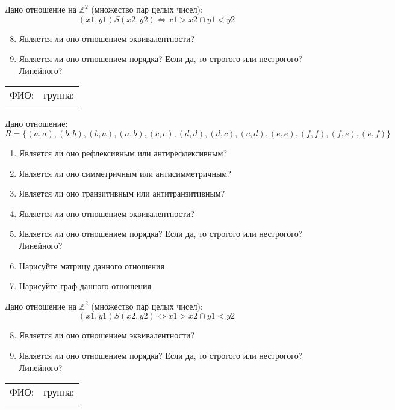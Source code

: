 \documentclass[russian,12pt]{article}
\begin{document}
Дано отношение на $\mathbb{Z}^2$ (множество пар целых чисел):
$$(x1, y1)S(x2, y2) \iff x1 > x2 \cap y1 < y2$$
\begin{enumerate}
\setcounter{enumi}{7}
\item Является ли оно отношением эквивалентности?
\item Является ли оно отношением порядка? Если да, то строгого или нестрогого? Линейного?
\end{enumerate}
\newpage
\thispagestyle{empty}
\begin{tabular}{|p{}|p{}|}
\hline
ФИО: & группа: \\
 & \\ \hline
\end{tabular}

\vspace{12pt}

Дано отношение:
$$R = \{(a, a), (b, b), (b, a), (a, b), (c, c), (d, d), (d, c), (c, d), (e, e), (f, f), (f, e), (e, f)\}$$
\begin{enumerate}
\item Является ли оно рефлексивным или антирефлексивным?
\item Является ли оно симметричным или антисимметричным?
\item Является ли оно транзитивным или антитранзитивным?
\item Является ли оно отношением эквивалентности?
\item Является ли оно отношением порядка? Если да, то строгого или нестрогого? Линейного?
\item Нарисуйте матрицу данного отношения
\item Нарисуйте граф данного отношения
\end{enumerate}

Дано отношение на $\mathbb{Z}^2$ (множество пар целых чисел):
$$(x1, y1)S(x2, y2) \iff x1 > x2 \cap y1 < y2$$
\begin{enumerate}
\setcounter{enumi}{7}
\item Является ли оно отношением эквивалентности?
\item Является ли оно отношением порядка? Если да, то строгого или нестрогого? Линейного?
\end{enumerate}
\newpage
\thispagestyle{empty}
\begin{tabular}{|p{}|p{}|}
\hline
ФИО: & группа: \\
 & \\ \hline
\end{tabular}
\end{document}
